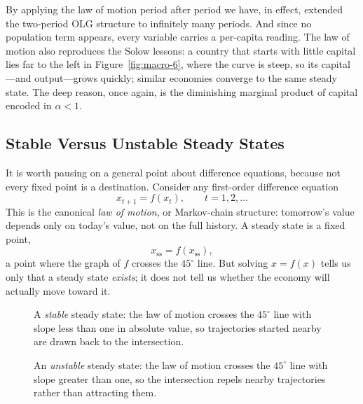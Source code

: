 
By applying the law of motion period after period we have, in effect, extended the two-period OLG structure to infinitely many periods. And since no population term appears, every variable carries a per-capita reading. The law of motion also reproduces the Solow lessons: a country that starts with little capital lies far to the left in Figure~\ref{fig:macro-6}, where the curve is steep, so its capital---and output---grows quickly; similar economies converge to the same steady state. The deep reason, once again, is the diminishing marginal product of capital encoded in $\alpha < 1$.

\subsection{Stable Versus Unstable Steady States}

It is worth pausing on a general point about difference equations, because not every fixed point is a destination. Consider any first-order difference equation
\[
x_{t+1} = f(x_t), \qquad t = 1, 2, \dots
\]
This is the canonical \emph{law of motion}, or Markov-chain structure: tomorrow's value depends only on today's value, not on the full history. A steady state is a fixed point,
\[
x_{\mathrm{ss}} = f(x_{\mathrm{ss}}),
\]
a point where the graph of $f$ crosses the $45^\circ$ line. But solving $x = f(x)$ tells us only that a steady state \emph{exists}; it does not tell us whether the economy will actually move toward it.

\begin{figure}[h]
\centering

\caption{A \emph{stable} steady state: the law of motion crosses the $45^\circ$ line with slope less than one in absolute value, so trajectories started nearby are drawn back to the intersection.}
\label{fig:macro-7}
\end{figure}

\begin{figure}[h]
\centering

\caption{An \emph{unstable} steady state: the law of motion crosses the $45^\circ$ line with slope greater than one, so the intersection repels nearby trajectories rather than attracting them.}
\label{fig:macro-8}
\end{figure}

